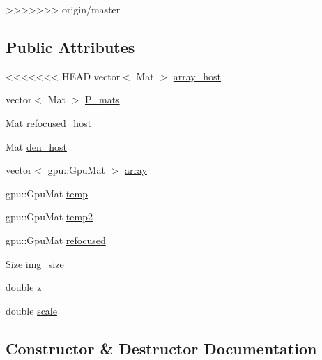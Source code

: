 \begin{DoxyCompactItemize}
\begin{DoxyCompactItemize}
>>>>>>> origin/master
\end{DoxyCompactItemize}
\subsection*{Public Attributes}
\begin{DoxyCompactItemize}
\item 
<<<<<<< HEAD
vector$<$ Mat $>$ \hyperlink{classgpuRefocus_a953d717ecac50c46a14074841e100166}{array\-\_\-host}
\item 
vector$<$ Mat $>$ \hyperlink{classgpuRefocus_a7e4bc1dd02a430a17f9d4f3762ba1818}{P\-\_\-mats}
\item 
Mat \hyperlink{classgpuRefocus_a897b942b2f19ee124e8abe5b7bfda87c}{refocused\-\_\-host}
\item 
Mat \hyperlink{classgpuRefocus_a00da230ed80738502c2b00c831fa8cd3}{den\-\_\-host}
\item 
vector$<$ gpu\-::\-Gpu\-Mat $>$ \hyperlink{classgpuRefocus_a489d63bfd7975d00ceacbf81a4162fae}{array}
\item 
gpu\-::\-Gpu\-Mat \hyperlink{classgpuRefocus_a5b9f962dd767a6635c7cc49777c2698a}{temp}
\item 
gpu\-::\-Gpu\-Mat \hyperlink{classgpuRefocus_acf08da2a44d6d6e57213db20adb51e43}{temp2}
\item 
gpu\-::\-Gpu\-Mat \hyperlink{classgpuRefocus_a3b2c86202e1900183168e1971069f016}{refocused}
\item 
Size \hyperlink{classgpuRefocus_acee020e8efe2bf650c3e984e9e56d4d2}{img\-\_\-size}
\item 
double \hyperlink{classgpuRefocus_ad8992176825beb8c6ddcc7b1a9b852bf}{z}
\item 
double \hyperlink{classgpuRefocus_a8cdaf53f83fcc39209277acc87b46209}{scale}
\end{DoxyCompactItemize}


\subsection{Constructor \& Destructor Documentation}
\hypertarget{classgpuRefocus_ab2f0271a5c8cb33ee6d1e3ae5d78ed21}{
}
\end{DoxyCompactItemize}

